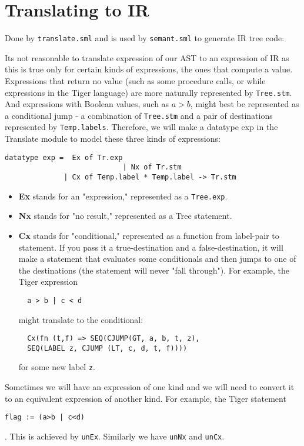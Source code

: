 \section{Translating to IR}


Done by \texttt{translate.sml} and is used by \texttt{semant.sml} to generate IR tree code. 

Its not reasonable to translate expression of our AST to an expression of IR as this is true only for certain kinds of expressions, the ones that  compute a value. Expressions that return no value (such as some procedure calls, or while expressions in the Tiger language) are more naturally represented by \texttt{Tree.stm}. And expressions with Boolean values, such as $a > b$, might best be represented as a conditional jump - a combination of \texttt{Tree.stm} and a pair of destinations represented by \texttt{Temp.labels}. Therefore, we will make a datatype exp in the Translate module to model these three kinds of expressions:

\begin{verbatim}
datatype exp =  Ex of Tr.exp
							| Nx of Tr.stm
              | Cx of Temp.label * Temp.label -> Tr.stm
\end{verbatim}

\begin{itemize}

\item \textbf{Ex} stands for an "expression," represented as a \texttt{Tree.exp}.
\item \textbf{Nx} stands for "no result," represented as a Tree statement.
\item \textbf{Cx} stands for "conditional," represented as a function from label-pair to  statement. If you pass it a true-destination and a false-destination, it will make a statement that evaluates some conditionals and then jumps to one of the  destinations (the statement will never "fall through"). For example, the Tiger expression 
  \begin{verbatim}
  a > b | c < d
  \end{verbatim} 
  might translate to the  conditional:
  \begin{verbatim}
  Cx(fn (t,f) => SEQ(CJUMP(GT, a, b, t, z),
  SEQ(LABEL z, CJUMP (LT, c, d, t, f))))
  \end{verbatim}
  for some new label \texttt{z}.
\end{itemize}

Sometimes we will have an expression of one kind and we will need to convert it to an equivalent expression of another kind. For example, the Tiger statement
\begin{verbatim}
flag := (a>b | c<d)
\end{verbatim}
. This is achieved by \texttt{unEx}. Similarly we have \texttt{unNx} and \texttt{unCx}.

